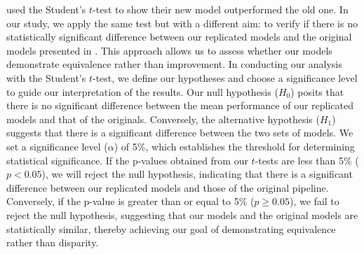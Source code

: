 \citet{andersonImprovedAccuracyQuantitative2017} used the Student's $t$-test to show their new model outperformed the old one. In our study, we apply the same test but with a different aim: to verify if there is no statistically significant difference between our replicated models and the original models presented in \citet{cleggRecalibrationMarsScience2017}. This approach allows us to assess whether our models demonstrate equivalence rather than improvement.
In conducting our analysis with the Student's $t$-test, we define our hypotheses and choose a significance level to guide our interpretation of the results.
Our null hypothesis (\(H_0\)) posits that there is no significant difference between the mean performance of our replicated models and that of the originals.
Conversely, the alternative hypothesis (\(H_1\)) suggests that there is a significant difference between the two sets of models.
We set a significance level (\(\alpha\)) of 5\%, which establishes the threshold for determining statistical significance.
If the p-values obtained from our $t$-tests are less than 5\% (\(p < 0.05\)), we will reject the null hypothesis, indicating that there is a significant difference between our replicated models and those of the original pipeline.
Conversely, if the p-value is greater than or equal to 5\% (\(p \geq 0.05\)), we fail to reject the null hypothesis, suggesting that our models and the original models are statistically similar, thereby achieving our goal of demonstrating equivalence rather than disparity.

